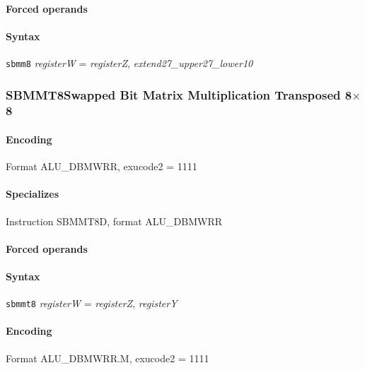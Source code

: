 {\paragraph{Forced operands} 

\paragraph{Syntax} \texttt{sbmm8} \emph{registerW} = \emph{registerZ}, \emph{extend27\_upper27\_lower10}
\newpage
\subsubsection[{\small SBMMT8: Swapped Bit Matrix Multiplication Transposed 8$\times$8}]{SBMMT8\hfill Swapped Bit Matrix Multiplication Transposed 8$\times$8}
\label{instr:SBMMT8}

\paragraph{Encoding} Format \textsf{ALU\_DBMWRR, exucode2 = 1111}\\



\paragraph{Specializes} Instruction SBMMT8D, format ALU\_DBMWRR

\paragraph{Forced operands} 

\paragraph{Syntax} \texttt{sbmmt8} \emph{registerW} = \emph{registerZ}, \emph{registerY}

\paragraph{Encoding} Format \textsf{ALU\_DBMWRR.M, exucode2 = 1111}\\



}
